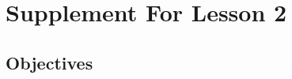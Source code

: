 \documentclass{article}
\begin{document}
\newfontfamily{}
\newfontfamily{}
\newcommand{\bul}{\hfil$\bullet$&}
\renewenvironment{glossary}{\begin{multicols}{5}\begin{center}}{\end{center}\end{multicols}}
\setcounter{secnumdepth}{0}
\setlength{\columnseprule}{1pt}

\section{Supplement For Lesson 2}

\subsection{Objectives}
\end{document}

